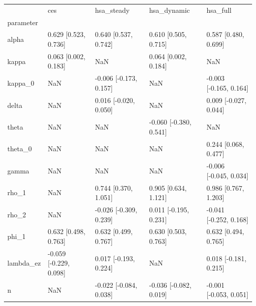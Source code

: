 \begin{tabular}{lllll}
\toprule
 & ces & hsa\_steady & hsa\_dynamic & hsa\_full \\
parameter &  &  &  &  \\
\midrule
alpha & 0.629 [0.523, 0.736] & 0.640 [0.537, 0.742] & 0.610 [0.505, 0.715] & 0.587 [0.480, 0.699] \\
kappa & 0.063 [0.002, 0.183] & NaN & 0.064 [0.002, 0.184] & NaN \\
kappa\_0 & NaN & -0.006 [-0.173, 0.157] & NaN & -0.003 [-0.165, 0.164] \\
delta & NaN & 0.016 [-0.020, 0.050] & NaN & 0.009 [-0.027, 0.044] \\
theta & NaN & NaN & -0.060 [-0.380, 0.541] & NaN \\
theta\_0 & NaN & NaN & NaN & 0.244 [0.068, 0.477] \\
gamma & NaN & NaN & NaN & -0.006 [-0.045, 0.034] \\
rho\_1 & NaN & 0.744 [0.370, 1.051] & 0.905 [0.634, 1.121] & 0.986 [0.767, 1.203] \\
rho\_2 & NaN & -0.026 [-0.309, 0.239] & 0.011 [-0.195, 0.231] & -0.041 [-0.252, 0.168] \\
phi\_1 & 0.632 [0.498, 0.763] & 0.632 [0.499, 0.767] & 0.630 [0.503, 0.763] & 0.632 [0.494, 0.765] \\
lambda\_ez & -0.059 [-0.229, 0.098] & 0.017 [-0.193, 0.224] & NaN & 0.018 [-0.181, 0.215] \\
n & NaN & -0.022 [-0.084, 0.038] & -0.036 [-0.082, 0.019] & -0.001 [-0.053, 0.051] \\
\bottomrule
\end{tabular}
